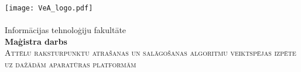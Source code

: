 \begin{titlepage}
	\newsavebox{\veatext}
	\newlength{\veatextwidth}
	\settowidth{\veatextwidth}{\usebox{\veatext}}
	\centering\texttt{[image: VeA\_logo.pdf]}\\[4pt]
	\usebox{\veatext}\\[6pt]
	\large Informācijas tehnoloģiju fakultāte\\[2cm]
	
	\textbf{Maģistra darbs}\\[1.5cm]
	
	\textsc{\Large Attēlu raksturpunktu atrašanas un salāgošanas algoritmu veiktspējas izpēte uz dažādām aparatūras platformām}
	\vfill %
	

\end{titlepage}

